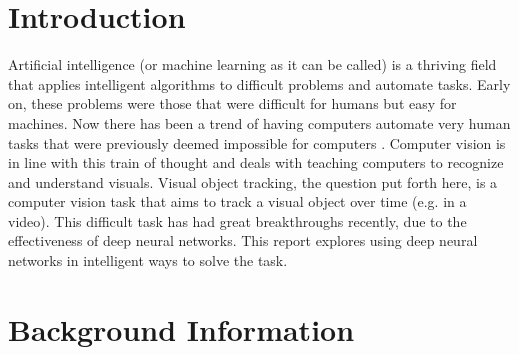\documentclass[letterpaper,12pt,titlepage,oneside,final]{book}
\begin{document}
 

\chapter{Introduction}
Artificial intelligence (or machine learning as it can be called) is a thriving field that applies intelligent algorithms to difficult problems and automate tasks. Early on, these problems were those that were difficult for humans but easy for machines. Now there has been a trend of having computers automate very human tasks that were previously deemed impossible for computers \cite{deep-learning-book}. Computer vision is in line with this train of thought and deals with teaching computers to recognize and understand visuals. Visual object tracking, the question put forth here, is a computer vision task that aims to track a visual object over time (e.g. in a video). This difficult task has had great breakthroughs recently, due to the effectiveness of deep neural networks. This report explores using deep neural networks in intelligent ways to solve the task.

\chapter{Background Information}
\end{document}
